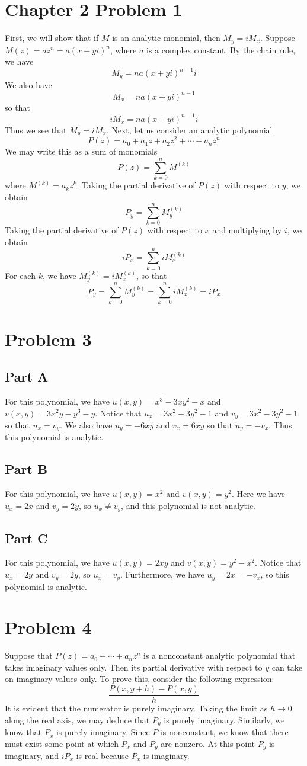 \documentclass[12pt]{article}
\begin{document}
\section*{Chapter 2 Problem 1}
First, we will show that if $M$ is an analytic monomial, then $M_y = iM_x$. Suppose $M(z) = az^n = a(x+yi)^n$, where $a$ is a complex constant. By the chain rule, we have
\[
M_y = na(x+yi)^{n-1}i
\] We also have
\[
M_x = na(x+yi)^{n-1}
\] so that
\[
iM_x = na(x+yi)^{n-1}i
\] Thus we see that $M_y = iM_x$. Next, let us consider an analytic polynomial
\[
P(z) = a_0 + a_1z + a_2 z^2 + \cdots + a_n z^n
\] We may write this as a sum of monomials
\[
P(z) = \sum_{k=0}^n M^{(k)}
\] where $M^{(k)} = a_k z^k$. Taking the partial derivative of $P(z)$ with respect to $y$, we obtain
\[
P_y = \sum_{k=0}^n M_y^{(k)}
\] Taking the partial derivative of $P(z)$ with respect to $x$ and multiplying by $i$, we obtain
\[
iP_x = \sum_{k=0}^n iM_x^{(k)}
\] For each $k$, we have $M_y^{(k)} = iM_x^{(k)}$, so that
\[
P_y = \sum_{k=0}^n M_y^{(k)} = \sum_{k=0}^n iM_x^{(k)} = iP_x
\]
\newpage
\section*{Problem 3}
\subsection*{Part A}
For this polynomial, we have $u(x,y) = x^3 - 3xy^2 - x$ and $v(x,y) = 3x^2y - y^3 - y$. Notice that $u_x = 3x^2 - 3y^2 - 1$ and $v_y = 3x^2 - 3y^2 - 1$ so that $u_x = v_y$. We also have $u_y = -6xy$ and $v_x = 6xy$ so that $u_y = -v_x$. Thus this polynomial is analytic.
\subsection*{Part B}
For this polynomial, we have $u(x,y) = x^2$ and $v(x,y) = y^2$. Here we have $u_x = 2x$ and $v_y = 2y$, so $u_x \neq v_y$, and this polynomial is not analytic.
\subsection*{Part C}
For this polynomial, we have $u(x,y) = 2xy$ and $v(x,y) = y^2-x^2$. Notice that $u_x = 2y$ and $v_y = 2y$, so $u_x = v_y$. Furthermore, we have $u_y = 2x = -v_x$, so this polynomial is analytic.
\newpage
\section*{Problem 4}
Suppose that $P(z)= a_0 + \cdots + a_nz^n$ is a nonconstant analytic polynomial that takes imaginary values only. Then its partial derivative with respect to $y$ can take on imaginary values only. To prove this, consider the following expression:
\[
\frac{P(x,y+h) - P(x,y)}{h}
\] It is evident that the numerator is purely imaginary. Taking the limit as $h \rightarrow 0$ along the real axis, we may deduce that $P_y$ is purely imaginary. Similarly, we know that $P_x$ is purely imaginary. Since $P$ is nonconstant, we know that there must exist some point at which $P_x$ and $P_y$ are nonzero. At this point $P_y$ is imaginary, and $iP_x$ is real because $P_x$ is imaginary.
\newpage
\end{document}
